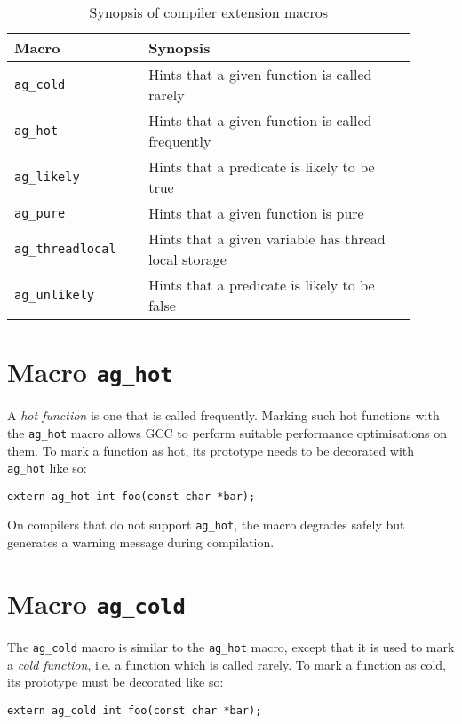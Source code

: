 \renewcommand\arraystretch{1.1}
\begin{table}[!htbp]
\centering
\small
\begin{tabular}[t]{>{\centering}m{0.3\linewidth}
    >{\raggedright\arraybackslash}m{0.6\linewidth}}
\toprule
\textbf{Macro} & \textbf{Synopsis} \\
\midrule
\texttt{ag\_cold} & Hints that a given function is called rarely \\
\texttt{ag\_hot} & Hints that a given function is called frequently \\
\texttt{ag\_likely} & Hints that a predicate is likely to be true \\
\texttt{ag\_pure} & Hints that a given function is pure \\
\texttt{ag\_threadlocal} & Hints that a given variable has thread local 
    storage \\
\texttt{ag\_unlikely} & Hints that a predicate is likely to be false \\
\bottomrule
\end{tabular}
\caption{Synopsis of compiler extension macros}
\label{tab:synopsis}
\end{table}


\section{Macro \texttt{ag\_hot}}
A \emph{hot function} is one that is called frequently. Marking such hot
functions with the \verb|ag_hot| macro allows GCC to perform suitable
performance optimisations on them. To mark a function as hot, its prototype
needs to be decorated with \verb|ag_hot| like so:
\begin{lstlisting}[linewidth=1.0\linewidth]
extern ag_hot int foo(const char *bar);
\end{lstlisting}

On compilers that do not support \verb|ag_hot|, the macro degrades safely
but generates a warning message during compilation.


\section{Macro \texttt{ag\_cold}}
The \verb|ag_cold| macro is similar to the \verb|ag_hot| macro, except
that it is used to mark a \emph{cold function}, i.e. a function which is called
rarely. To mark a function as cold, its prototype must be decorated like so:
\begin{lstlisting}[linewidth=1.0\linewidth]
extern ag_cold int foo(const char *bar);
\end{lstlisting}

